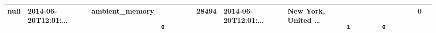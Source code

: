 \documentclass[12pt,a4paper,twoside,openright,titlepage,final]{article}
\begin{document}
\begin{enumerate}
\begin{longtable}[]{@{}lllllllllll@{}}
		\begin{minipage}[t]{0.03\columnwidth}\raggedright\strut
			null
			\strut\end{minipage} &
		\begin{minipage}[t]{0.11\columnwidth}\raggedright\strut
			2014-06-20T12:01:\ldots{}
			\strut\end{minipage} &
		\begin{minipage}[t]{0.08\columnwidth}\raggedright\strut
			ambient\_memory
			\strut\end{minipage} &
		\begin{minipage}[t]{0.05\columnwidth}\raggedright\strut
			\begin{verbatim}
			0
			\end{verbatim}
			\strut\end{minipage} &
		\begin{minipage}[t]{0.03\columnwidth}\raggedright\strut
			28494
			\strut\end{minipage} &
		\begin{minipage}[t]{0.11\columnwidth}\raggedright\strut
			2014-06-20T12:01:\ldots{}
			\strut\end{minipage} &
		\begin{minipage}[t]{0.11\columnwidth}\raggedright\strut
			New York, United \ldots{}
			\strut\end{minipage} &
		\begin{minipage}[t]{0.06\columnwidth}\raggedright\strut
			\begin{verbatim}
			1
			\end{verbatim}
			\strut\end{minipage} &
		\begin{minipage}[t]{0.04\columnwidth}\raggedright\strut
			\begin{verbatim}
			0
			\end{verbatim}
			\strut\end{minipage} &
		\begin{minipage}[t]{0.04\columnwidth}\raggedright\strut
			0
			\strut\end{minipage}\tabularnewline
		\bottomrule
	\end{longtable}
	

\end{enumerate}
\end{document}
